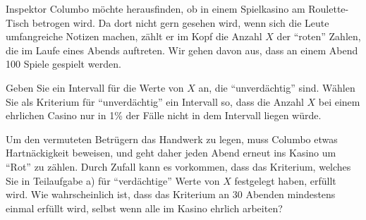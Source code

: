 Inspektor Columbo möchte herausfinden, ob in einem Spielkasino
am Roulette-Tisch betrogen wird.
Da dort nicht gern gesehen wird, wenn sich die Leute umfangreiche Notizen
machen, zählt er im Kopf die Anzahl $X$ der ``roten'' Zahlen,
die im Laufe eines Abends auftreten.
Wir gehen davon aus, dass an einem Abend 100 Spiele gespielt werden.
\begin{teilaufgaben}
\item Geben Sie ein Intervall für die Werte von $X$ an, die ``unverdächtig''
sind. Wählen Sie als Kriterium für ``unverdächtig'' ein Intervall so, dass
die Anzahl $X$ bei einem ehrlichen Casino nur in 1\% der Fälle nicht
in dem Intervall liegen würde.
\item Um den vermuteten Betrügern das Handwerk zu legen, muss Columbo
etwas Hartnäckigkeit beweisen, und geht daher jeden Abend erneut
ins Kasino um ``Rot'' zu zählen. Durch Zufall kann es vorkommen, dass
das Kriterium, welches Sie in Teilaufgabe a) für ``verdächtige''
Werte von $X$ festgelegt haben, erfüllt wird. Wie wahrscheinlich ist,
dass das Kriterium an 30 Abenden mindestens einmal erfüllt wird, selbst
wenn alle im Kasino ehrlich arbeiten?
\end{teilaufgaben}


